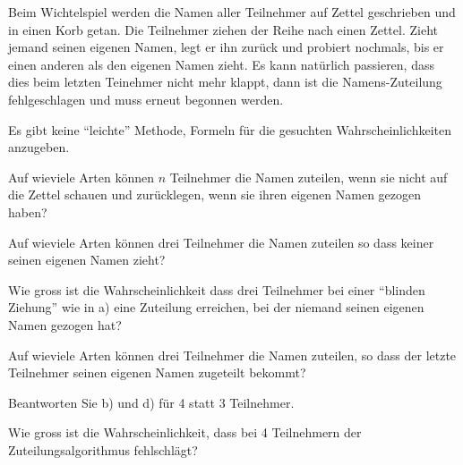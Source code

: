 Beim Wichtelspiel werden die Namen aller Teilnehmer auf Zettel geschrieben
und in einen Korb getan.
Die Teilnehmer ziehen der Reihe nach einen Zettel.
Zieht jemand seinen eigenen Namen, legt er ihn zurück und probiert
nochmals, bis er einen anderen als den eigenen Namen zieht.
Es kann natürlich passieren, dass dies beim letzten Teinehmer
nicht mehr klappt, dann ist die Namens-Zuteilung fehlgeschlagen und
muss erneut begonnen werden.

\begin{hinweis}
Es gibt keine ``leichte'' Methode, Formeln für die gesuchten
Wahrscheinlichkeiten anzugeben.
\end{hinweis}


\begin{teilaufgaben}
\item Auf wieviele Arten können $n$ Teilnehmer die Namen zuteilen,
wenn sie nicht auf die Zettel schauen und zurücklegen, wenn sie ihren
eigenen Namen gezogen haben?
\item Auf wieviele Arten können drei Teilnehmer die Namen zuteilen
so dass keiner seinen eigenen Namen zieht?
\item Wie gross ist die Wahrscheinlichkeit dass drei Teilnehmer
bei einer ``blinden Ziehung'' wie in a) eine Zuteilung erreichen, bei
der niemand seinen eigenen Namen gezogen hat?
\item Auf wieviele Arten können drei Teilnehmer die Namen zuteilen,
so dass der letzte Teilnehmer seinen eigenen Namen zugeteilt bekommt?
\item Beantworten Sie b) und d) für 4 statt 3 Teilnehmer.
\item Wie gross ist die Wahrscheinlichkeit, dass bei 4 Teilnehmern
der Zuteilungsalgorithmus fehlschlägt?
\end{teilaufgaben}

